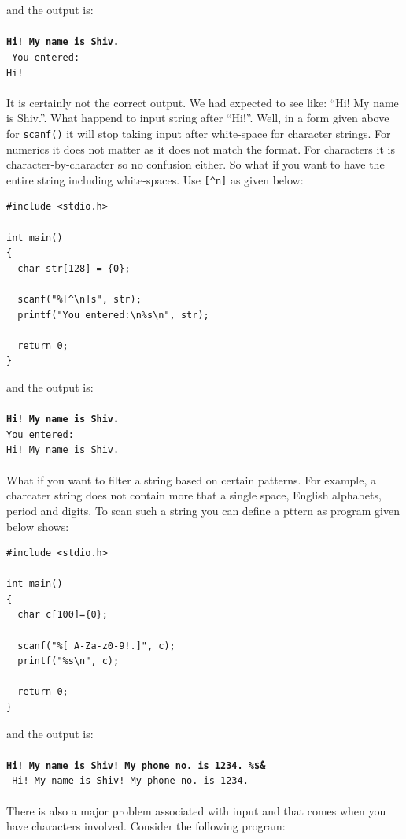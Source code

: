 and the output is:
\\\\\texttt{\textbf{Hi! My name is Shiv.\\}
You entered:\\
Hi!\\\\}
It is certainly not the correct output. We had expected to see like: ``Hi! My
name is Shiv.''. What happend to input string after ``Hi!''. Well, in a form
given above for \texttt{scanf()} it will stop taking input after white-space
for character strings. For numerics it does not matter as it does not match the
format. For characters it is character-by-character so no confusion either. So
what if you want to have the entire string including white-spaces. Use
\texttt{[\^{}n]} as given below:

\begin{Verbatim}[frame=single]
#include <stdio.h>

int main()
{
  char str[128] = {0};

  scanf("%[^\n]s", str);
  printf("You entered:\n%s\n", str);

  return 0;
}
\end{Verbatim}

and the output is:
\\\\\texttt{\textbf{Hi! My name is Shiv.}\\
You entered:\\
Hi! My name is Shiv.\\\\}
What if you want to filter a string based on certain patterns. For example, a
charcater string does not contain more that a single space, English alphabets,
period and digits. To scan such a string you can define a pttern as program
given below shows:

\begin{Verbatim}[frame=single]
#include <stdio.h>

int main()
{
  char c[100]={0};

  scanf("%[ A-Za-z0-9!.]", c);
  printf("%s\n", c);

  return 0;
}
\end{Verbatim}

and the output is:
\\\\\texttt{\textbf{Hi! My name is Shiv! My phone no. is 1234. \%\^\$\&\*\\}
Hi! My name is Shiv! My phone no. is 1234.\\\\}
There is also a major problem associated with input and that comes when you
have characters involved. Consider the following program:

